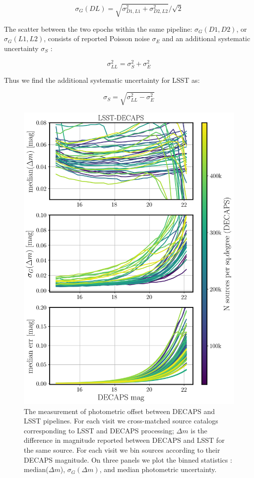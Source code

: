 \documentclass[DM,lsstdraft,toc,usenatbib]{lsstdoc}
\begin{document}
\begin{equation}
\label{eq:spread}
\sigma_{G}(DL) = \sqrt{\sigma_{D1,L1}^{2} + \sigma_{D2,L2}^{2}} / \sqrt{2}
\end{equation}


The scatter between the two epochs within the same pipeline:   $\sigma_{G}(D1,D2)$, or $\sigma_{G}(L1,L2)$, consists of  reported Poisson noise $\sigma_{E} $ and an additional systematic uncertainty $\sigma_{S}$ : 

\begin{equation}
\sigma_{LL}^{2} = \sigma_{S}^{2} + \sigma_{E}^{2}
\end{equation}

Thus we find  the additional systematic uncertainty for LSST as:

\begin{equation}
\label{eq:systematics}
\sigma_{S} = \sqrt{\sigma_{LL}^2  - \sigma_{E}^{2}}
\end{equation}




\begin{figure}
\begin{centering}
\includegraphics[width=0.7\columnwidth]{figs/decaps_lsst_rms_plot.png}
\caption{The measurement of photometric offset between DECAPS and LSST pipelines. For each visit we cross-matched source catalogs corresponding to LSST and DECAPS processing; $\Delta m$ is the difference in magnitude reported between DECAPS and LSST for the same source. For each visit we bin sources according to their DECAPS magnitude. On three panels we plot the binned statistics : median($\Delta m$),  $\sigma_{G}(\Delta m)$, and median photometric uncertainty.}
\label{fig:lsst_decaps_dmag}
\end{centering}
\end{figure} 
\end{document}
